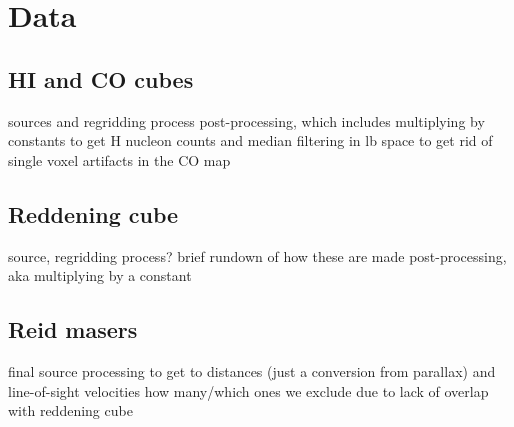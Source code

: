 \section{Data}
\label{sec:data}
\subsection{HI and CO cubes}
sources and regridding process
post-processing, which includes multiplying by constants to get H nucleon counts and median filtering in lb space to get rid of single voxel artifacts in the CO map

\subsection{Reddening cube}
source, regridding process?
brief rundown of how these are made
post-processing, aka multiplying by a constant

\subsection{Reid masers}
final source
processing to get to distances (just a conversion from parallax) and line-of-sight velocities
how many/which ones we exclude due to lack of overlap with reddening cube